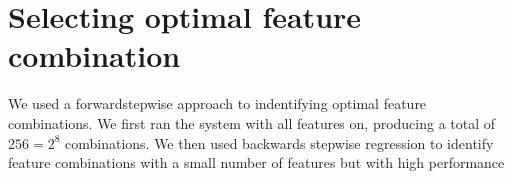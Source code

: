 \documentclass{article}
\begin{document}
\section{Selecting optimal feature combination}
\newcommand\ward{forward} %
We used a \ward stepwise approach to indentifying optimal feature combinations.
We first ran the system with all features on, producing a total of $256=2^8$ combinations.
We then used backwards stepwise regression to identify feature combinations
with a small number of features but with high performance
\end{document}

